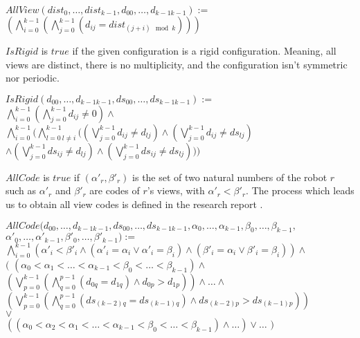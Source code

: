 \documentclass{article}
\begin{document}
\begin{center}
    
$AllView(dist_{0}, \ldots ,dist_{k-1}, d_{00}, \ldots ,d_{k-1k-1}):=$\\
$(\bigwedge_{i=0}^{k-1} (\bigwedge_{j=0}^{k-1} (d_{ij} = dist_{(j+i) \mod{k}}) ) )$
\end{center}

$IsRigid$ is $true$ if the given configuration is a rigid configuration. Meaning, all views are distinct, there is no multiplicity, and the configuration isn't symmetric nor periodic.

\begin{center}

$IsRigid(d_{00}, \ldots ,d_{k-1k-1}, ds_{00}, \ldots ,ds_{k-1k-1}):=$\\
$\bigwedge_{i=0}^{k-1}(\bigwedge_{j=0}^{k-1}d_{ij}\not=0)\land $\\%
$\bigwedge_{i=0}^{k-1}(
\bigwedge_{l=0\ l\not=i}^{k-1}(
(\bigvee_{j=0}^{k-1}d_{ij} \not= d_{lj})
\land (\bigvee_{j=0}^{k-1}d_{ij} \not= ds_{lj})$\\
$\land (\bigvee_{j=0}^{k-1}ds_{ij} \not= d_{lj})
\land (\bigvee_{j=0}^{k-1}ds_{ij} \not= ds_{lj})
) )$\\%
\end{center}

$AllCode$ is $true$ if $(\alpha'_{r}, \beta'_{r})$ is the set of two natural numbers of the robot $r$ such as $\alpha'_r$ and $\beta'_r$ are codes of $r$'s views, with $\alpha'_{r} < \beta'_{r}$. The process which leads us to obtain all view codes is defined in the research report \cite{gathering}. 

\begin{center}
$AllCode(d_{00}, \ldots ,d_{k-1k-1}, ds_{00}, \ldots ,ds_{k-1k-1}, \alpha_{0}, \dots, \alpha_{k-1}, \beta_{0}, \dots, \beta_{k-1},$\\
$\alpha'_{0}, \dots, \alpha'_{k-1}, \beta'_{0}, \dots, \beta'_{k-1}) :=$\\
$\bigwedge_{i = 0}^{k-1} \left( \alpha'_{i} < \beta'_{i} \land (\alpha'_{i} = \alpha_{i} \lor \alpha'_{i} = \beta_{i}) \land (\beta'_{i} = \alpha_{i} \lor \beta'_{i} = \beta_{i}) \right) \land $\\
$($
$(\alpha_{0} < \alpha_{1} < \dots < \alpha_{k-1} < \beta_{0} < \dots < \beta_{k-1}) \land $\\
$(\bigvee_{p=0}^{k-1}(\bigwedge_{q=0}^{p-1}(d_{0q} = d_{1q}) \land d_{0p} > d_{1p} ) )\land \dots \land $\\
$(\bigvee_{p=0}^{k-1}(\bigwedge_{q=0}^{p-1}(ds_{(k-2)q} = ds_{(k-1)q}) \land ds_{(k-2)p} > ds_{(k-1)p} ) )$\\
$\lor $\\
$((\alpha_{0} < \alpha_{2} < \alpha_{1} < \dots < \alpha_{k-1} < \beta_{0} < \dots < \beta_{k-1}) \land \dots) \lor \dots$
$)$
\end{center}
\end{document}
